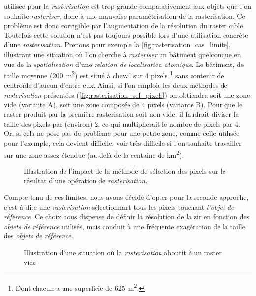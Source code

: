 utilisée pour la \emph{rasterisation} est trop grande comparativement
aux objets que l'on souhaite \emph{rasteriser,} donc à une mauvaise
paramétrisation de la rasterisation. Ce problème est donc corrigible
par l'augmentation de la résolution du raster cible. Toutefois cette
solution n'est pas toujours possible lors d'une utilisation concrète
d'une \emph{rasterisation.} Prenons pour exemple la
\autoref{fig:rasterisation_cas_limite}, illustrant une situation où
l'on cherche à \emph{rasteriser} un bâtiment quelconque en vue de la
\emph{spatialisation} d'une \emph{relation de localisation atomique.}
Le bâtiment, de taille moyenne (\ie \SI{200}{\metre\squared}) est
situé à cheval sur 4 pixels \footnote{Dont chacun a une superficie de
  \SI{625}{\metre\squared}.} sans contenir de centroïde d'aucun
d'entre eux. Ainsi, si l'on emploie les deux méthodes de
\emph{rasterisation} présentées
(\autoref{fig:rasterisation_sel_pixels}) on obtiendra soit une zone
vide (variante \textcolor{RdBu-9-1}{\textsf{A}}), soit une zone
composée de 4 pixels (variante \textcolor{RdBu-9-9}{\textsf{B}}). Pour
que le raster produit par la première rasterisation soit non vide, il
faudrait diviser la taille des pixels par (environ) 2, ce qui
multiplierait le nombre de pixels par 4. Or, si cela ne pose pas de
problème pour une petite zone, comme celle utilisée pour l'exemple,
cela devient difficile, voir très difficile si l'on souhaite
travailler sur une zone assez étendue (au-delà de la centaine de
\si{\kilo\meter\squared}).

\begin{figure}
  \centering
  
  \caption{Illustration de l'impact de la méthode de sélection des
    pixels sur le résultat d'une opération de \emph{rasterisation.}}
  \label{fig:rasterisation_sel_pixels}
\end{figure}

Compte-tenu de ces limites, nous avons décidé d'opter pour la seconde
approche, c'est-à-dire une \emph{rasterisation} sélectionnant tous les
pixels touchant \emph{l'objet de référence.} Ce choix nous dispense de
définir la résolution de la \ac{zir} en fonction des \emph{objets de
  référence} utilisés, mais conduit à une fréquente exagération de la
taille des \emph{objets de référence.}

\begin{wrapfigure}{r}{4cm}
  \centering
  
  \caption{Illustration d'une situation où la \emph{rasterisation}
    aboutit à un raster vide}
  \label{fig:rasterisation_cas_limite}
\end{wrapfigure}

